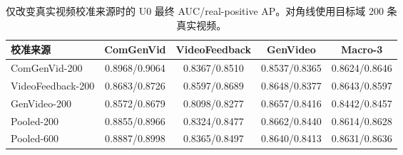 \begin{table}[!t]
  \centering
  \caption{仅改变真实视频校准来源时的 U0 最终 AUC/real-positive AP。对角线使用目标域 200 条真实视频。}
  \label{tab:u0_cross_calibration}
  \begin{tabular}{lcccc}
    \toprule
    校准来源 & ComGenVid & VideoFeedback & GenVideo & Macro-3 \\
    \midrule
    ComGenVid-200 & 0.8968/0.9064 & 0.8367/0.8510 & 0.8537/0.8365 & 0.8624/0.8646 \\
    VideoFeedback-200 & 0.8683/0.8726 & 0.8597/0.8689 & 0.8648/0.8377 & 0.8643/0.8597 \\
    GenVideo-200 & 0.8572/0.8679 & 0.8098/0.8277 & 0.8657/0.8416 & 0.8442/0.8457 \\
    Pooled-200 & 0.8855/0.8966 & 0.8324/0.8477 & 0.8662/0.8440 & 0.8614/0.8628 \\
    Pooled-600 & 0.8887/0.8998 & 0.8365/0.8497 & 0.8640/0.8413 & 0.8631/0.8636 \\
    \bottomrule
  \end{tabular}
\end{table}
